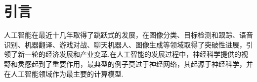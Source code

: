 \documentclass{SCIS2020cn}
\begin{document}






\section{引言}
人工智能在最近十几年取得了跳跃式的发展\cite{deep-learning-nature}，在图像分类\cite{he2015delving, szegedy2015going, he2016deep, dosovitskiy2020image}、目标检测和跟踪\cite{girshick2014rich, redmon2016you}、语音识别\cite{graves2013speech, graves2013hybrid}、机器翻译\cite{sutskever2014sequence, bahdanau2014neural, sennrich2015neural}、游戏对战\cite{mnih2015human, silver2017mastering}、聊天机器人\cite{NEURIPS2020_1457c0d6, zeng2021pangualphalargescaleautoregressivepretrained, openai2024gpt4technicalreport}、图像生成\cite{NIPS2014_5ca3e9b1, DBLP:journals/corr/RadfordMC15, Rombach_2022_CVPR}等领域取得了突破性进展，引领了新一轮的经济发展和产业变革.在人工智能的发展过程中，神经科学提供的视野和灵感起到了重要作用\cite{hassabis2017neuroscience, Zador2023}，最典型的例子莫过于神经网络，其起源于神经科学，并在人工智能领域作为最主要的计算模型.
\end{document}
